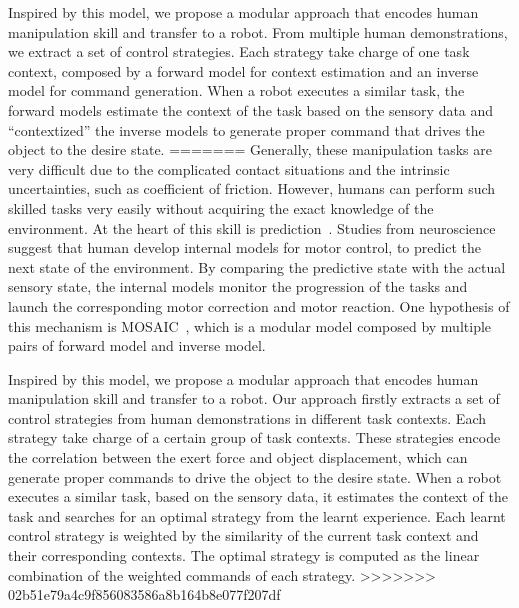 Inspired by this model, we propose a modular approach that encodes human manipulation skill and transfer to a robot. From multiple human demonstrations, we extract a set of control strategies. Each strategy take charge of one task context, composed by a forward model for context estimation and an inverse model for command generation. When a robot executes a similar task, the forward models estimate the context of the task based on the sensory data and ``contextized'' the inverse models to generate proper command that drives the object to the desire state.
=======
Generally, these manipulation tasks are very difficult due to the complicated contact situations and the intrinsic uncertainties, such as coefficient of friction. However, humans can perform such skilled tasks very easily without acquiring the exact knowledge of the environment. At the heart of this skill is prediction~\cite{flanagan2006control}. Studies from neuroscience suggest that human develop internal models for motor control, to predict the next state of the environment. By comparing the predictive state with the actual sensory state, the internal models monitor the progression of the tasks and launch the corresponding motor correction and motor reaction. One hypothesis of this mechanism is MOSAIC~\cite{haruno2001mosaic}, which is a modular model composed by multiple pairs of forward model and inverse model. %


Inspired by this model, we propose a modular approach that encodes human manipulation skill and transfer to a robot.
Our approach firstly extracts a set of control strategies from human demonstrations in different task contexts. Each strategy take charge of a certain group of task contexts. These strategies encode the correlation between the exert force and object displacement, which can generate proper commands to drive the object to the desire state.
When a robot executes a similar task, based on the sensory data, it estimates the context of the task and searches for an optimal strategy from the learnt experience. Each learnt control strategy is weighted by the similarity of the current task context and their corresponding contexts. The optimal strategy is computed as the linear combination of the weighted commands of each strategy.
>>>>>>> 02b51e79a4c9f856083586a8b164b8e077f207df

